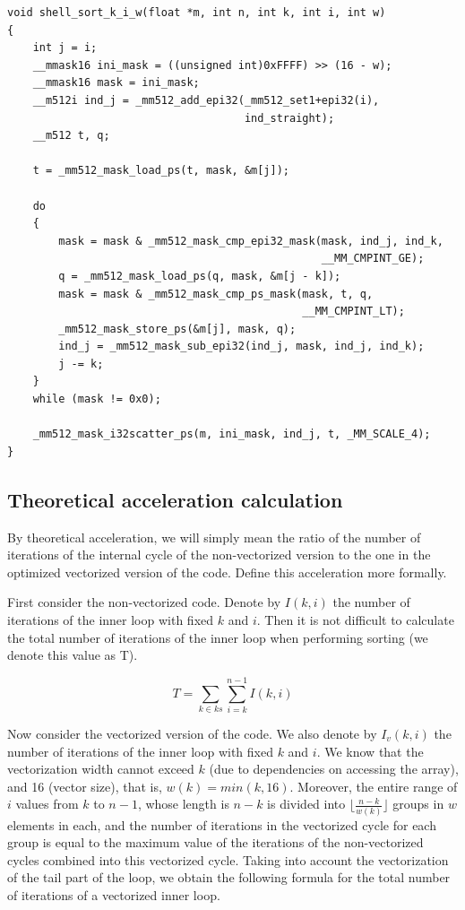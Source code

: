 \documentclass[
11pt,%
tightenlines,%
twoside,%
onecolumn,%
nofloats,%
nobibnotes,%
nofootinbib,%
superscriptaddress,%
noshowpacs,%
centertags]%
{revtex4}
\begin{document}
\begin{lstlisting}[caption={Vectorized version of Shell sorting kernel},label={lst:vectcode}]
void shell_sort_k_i_w(float *m, int n, int k, int i, int w)
{
    int j = i;
    __mmask16 ini_mask = ((unsigned int)0xFFFF) >> (16 - w);
    __mmask16 mask = ini_mask;
    __m512i ind_j = _mm512_add_epi32(_mm512_set1+epi32(i),
                                     ind_straight);
    __m512 t, q;
    
    t = _mm512_mask_load_ps(t, mask, &m[j]);

    do
    {
        mask = mask & _mm512_mask_cmp_epi32_mask(mask, ind_j, ind_k,
                                                 __MM_CMPINT_GE);
        q = _mm512_mask_load_ps(q, mask, &m[j - k]);
        mask = mask & _mm512_mask_cmp_ps_mask(mask, t, q,
                                              __MM_CMPINT_LT);
        _mm512_mask_store_ps(&m[j], mask, q);
        ind_j = _mm512_mask_sub_epi32(ind_j, mask, ind_j, ind_k);
        j -= k;
    }
    while (mask != 0x0);
    
    _mm512_mask_i32scatter_ps(m, ini_mask, ind_j, t, _MM_SCALE_4);
}
\end{lstlisting}

\subsection*{Theoretical acceleration calculation}

By theoretical acceleration, we will simply mean the ratio of the number of iterations of the internal cycle of the non-vectorized version to the one in the optimized vectorized version of the code.
Define this acceleration more formally.

First consider the non-vectorized code.
Denote by $ I (k, i) $ the number of iterations of the inner loop with fixed $ k $ and $ i $.
Then it is not difficult to calculate the total number of iterations of the inner loop when performing sorting (we denote this value as T).

\begin{equation}
T = \sum_{k \in ks}{\sum_{i = k}^{n - 1}{I(k, i)}}
\end{equation}

Now consider the vectorized version of the code. We also denote by $ I_v (k, i) $ the number of iterations of the inner loop with fixed $ k $ and $ i $.
We know that the vectorization width cannot exceed $ k $ (due to dependencies on accessing the array), and 16 (vector size), that is, $ w (k) = min (k, 16) $.
Moreover, the entire range of $ i $ values from $ k $ to $ n - 1 $, whose length is $ n - k $ is divided into $ \lfloor \frac {n - k} {w (k)} \rfloor $ groups in $ w $ elements in each, and the number of iterations in the vectorized cycle for each group is equal to the maximum value of the iterations of the non-vectorized cycles combined into this vectorized cycle.
Taking into account the vectorization of the tail part of the loop, we obtain the following formula for the total number of iterations of a vectorized inner loop.
\end{document}
